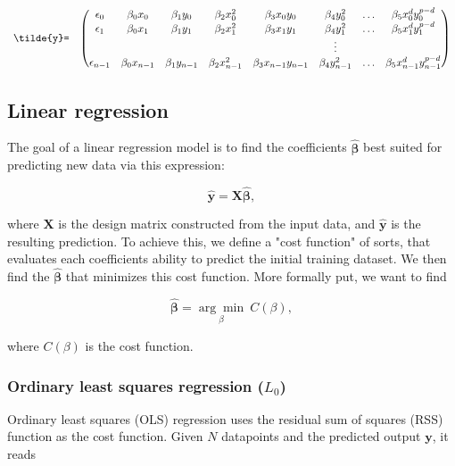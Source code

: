 \documentclass[../main.tex]{subfiles}
\begin{document}
\[
\begin{array}{lccccccc}
  \verb|\tilde{y}=| & \left(\begin{array}{@{}cccccccc@{}}
    \epsilon_0 & \beta_0 x_0 &  \beta_1 y_0 &  \beta_2 x_0^2 &  \beta_3 x_0y_0 &  \beta_4 y_0^2 & \ldots &  \beta_5 x_0^d y_0^{p-d}\\
    \epsilon_1 & \beta_0 x_1 &  \beta_1 y_1 &  \beta_2 x_1^2 &  \beta_3 x_1y_1 &  \beta_4 y_1^2 & \ldots &  \beta_5 x_1^d y_1^{p-d}\\
     &  &  &  &  & \vdots & \\
    \epsilon_{n-1} & \beta_0 x_{n-1} & \beta_1 y_{n-1} & \beta_2 x_{n-1}^2 & \beta_3 x_{n-1}y_{n-1} & \beta_4 y_{n-1}^2 & \ldots & \beta_5 x_{n-1}^d y_{n-1}^{p-d}\\
 \end{array}\right) \\[15pt]
\end{array}
\]

\subsection{Linear regression}
The goal of a linear regression model is to find the coefficients $\hat{\mathbf \beta}$ best suited for predicting new data via this expression:

\begin{equation*}
  \hat{\mathbf y} = \mathbf X\hat{\mathbf \beta},
\end{equation*}

where $\mathbf X$ is the design matrix constructed from the input data, and $\hat{\mathbf y}$ is the resulting prediction. To achieve this, we define a "cost function" of sorts, that evaluates each coefficients ability to predict the initial training dataset. We then find the $\hat{\mathbf \beta}$ that minimizes this cost function. More formally put, we want to find

\begin{equation}
  \hat{\mathbf \beta} = \underset{\beta}{\arg \min}\ C(\beta),
\end{equation}

where $C(\beta)$ is the cost function.


\subsubsection{Ordinary least squares regression ($L_0$)}
Ordinary least squares (OLS) regression uses the residual sum of squares (RSS) function as the cost function. Given $N$ datapoints and the predicted output $\mathbf y$, it reads
\end{document}
